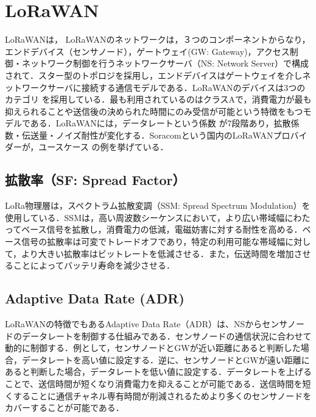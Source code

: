 \section{LoRaWAN}
LoRaWANは，
LoRaWANのネットワークは，３つのコンポーネントからなり，エンドデバイス（センサノード），ゲートウェイ(GW: Gateway)，アクセス制御・ネットワーク制御を行うネットワークサーバ（NS: Network Server）で構成されて．スター型のトポロジを採用し，エンドデバイスはゲートウェイを介しネットワークサーバに接続する通信モデルである．LoRaWANのデバイスは3つのカテゴリ
  を採用している．最も利用されているのはクラスAで，消費電力が最も抑えられることや送信後の決められた時間にのみ受信が可能という特徴をもつモデルである．LoRaWANには，データレートという係数
  が7段階あり，拡散係数・伝送量・ノイズ耐性が変化する．Soracomという国内のLoRaWANプロバイダーが，ユースケース
    の例を挙げている．

\subsection{拡散率（SF: Spread Factor）}
LoRa物理層は，スペクトラム拡散変調（SSM: Spread Spectrum Modulation）を使用している．SSMは，高い周波数シーケンスにおいて，より広い帯域幅にわたってベース信号を拡散し，消費電力の低減，電磁妨害に対する耐性を高める．ベース信号の拡散率は可変でトレードオフであり，特定の利用可能な帯域幅に対して，より大きい拡散率はビットレートを低減させる．また，伝送時間を増加させることによってバッテリ寿命を減少させる．

\subsection{Adaptive Data Rate (ADR)}
LoRaWANの特徴でもあるAdaptive Data Rate（ADR）は、NSからセンサノードのデータレートを制御する仕組みである．センサノードの通信状況に合わせて動的に制御する．例として，センサノードとGWが近い距離にあると判断した場合，データレートを高い値に設定する．逆に、センサノードとGWが遠い距離にあると判断した場合，データレートを低い値に設定する．データレートを上げることで、送信時間が短くなり消費電力を抑えることが可能である．送信時間を短くすることに通信チャネル専有時間が削減されるためより多くのセンサノードをカバーすることが可能である．

